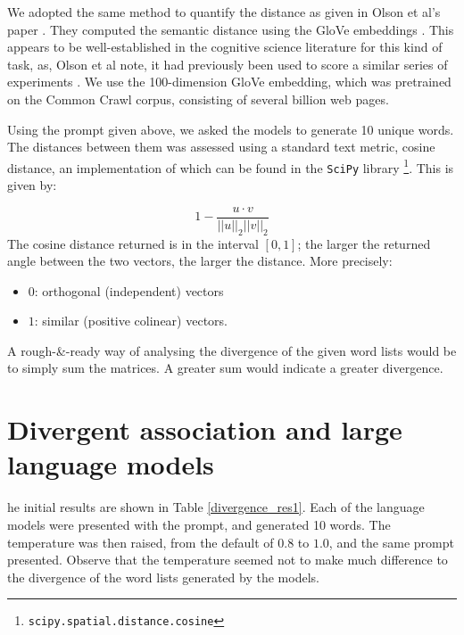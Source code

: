 \documentclass[9pt,a4paper,twoside]{rho-class/rho}
\begin{document}
We adopted the same method to quantify the distance as given in Olson et al's paper \cite{Olson_2021}. They computed the semantic distance using the GloVe embeddings \cite{Pennington_2014}.  This appears to be well-established in the cognitive science literature for this kind of task, as, Olson et al note, it had previously been used to score a similar series of experiments \cite{beaty2021automating} \cite{dumas2021measuring}. We use the 100-dimension GloVe embedding, which was pretrained on the Common Crawl corpus, consisting of several billion web pages.  

Using the prompt given above, we asked the models to generate 10 unique words. The distances between them was assessed using a standard text metric, cosine distance, an implementation of which can be found in the \texttt{SciPy}  library \footnote{\texttt{scipy.spatial.distance.cosine}}. This is given by:

\begin{equation} \label{ec:cosine_distance}
1 - \frac{u \cdot v}{\left|\left|u\right|\right|_{2} \left|\left|v\right|\right|_{2}} \nonumber
\end{equation}
The cosine distance returned is in the interval $[0,1]$; the larger the returned angle between the two vectors, the larger the distance. More precisely:

\begin{itemize}
    \item $0$: orthogonal (independent) vectors
    \item $1$: similar (positive colinear) vectors.
\end{itemize}

A rough-\&-ready way of analysing the divergence of the given word lists would be to simply sum the matrices. A greater sum would indicate a greater divergence.

\section{Divergent association and large language models}

he initial results are shown in Table \ref{divergence_res1}. Each of the language models were presented with the prompt, and generated 10 words. The temperature was then raised, from the default of $0.8$ to $1.0$, and the same prompt presented. Observe that the temperature seemed not to make much difference to the divergence of the word lists generated by the models. 
\end{document}
